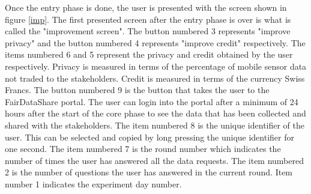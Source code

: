 Once the entry phase is done, the user is presented with the screen shown in figure \ref{imp}. The first presented screen after the entry phase is over is what is called the "improvement screen". 
The button numbered 3
represents "improve privacy" and the button numbered 4 represents "improve credit" respectively. The items numbered 6 and 5 represent the privacy  and credit obtained by the user respectively. Privacy is measured in terms of the percentage of mobile sensor data not traded to the stakeholders. Credit is measured in terms of the currency Swiss Francs. The button numbered 9 is the button that takes the user to the FairDataShare portal. The user can  login into the portal after a minimum of 24 hours after the start of the core phase to see the data that has been collected and shared with the stakeholders. The item numbered 8 is the unique identifier of the user. This can be selected and copied by long pressing the unique identifier for one second. The item numbered 7 is the round number which indicates the number of times the user has answered all the data requests. The item numbered 2 is the number of questions the user has answered in the current round. Item number 1 indicates the experiment day number.



